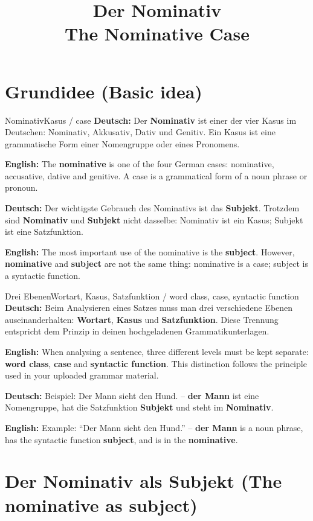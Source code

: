 \documentclass[a4paper,11pt]{article}
\title{Der Nominativ\\\large \textnormal{The Nominative Case}}
\date{}
\newcommand{\GermanText}[1]{\textbf{Deutsch: }#1\par}
\newcommand{\EnglishText}[1]{{\small\color{SoftGray}\textbf{English: }#1\par}}
\begin{document}
\maketitle
\tableofcontents
\newpage

\section{Grundidee \textnormal{(Basic idea)}}

\begin{grammarentry}{Nominativ}{Kasus / case}
\GermanText{Der \textbf{Nominativ} ist einer der vier Kasus im Deutschen: Nominativ, Akkusativ, Dativ und Genitiv. Ein Kasus ist eine grammatische Form einer Nomengruppe oder eines Pronomens.}
\EnglishText{The \textbf{nominative} is one of the four German cases: nominative, accusative, dative and genitive. A case is a grammatical form of a noun phrase or pronoun.}

\GermanText{Der wichtigste Gebrauch des Nominativs ist das \textbf{Subjekt}. Trotzdem sind \textbf{Nominativ} und \textbf{Subjekt} nicht dasselbe: Nominativ ist ein Kasus; Subjekt ist eine Satzfunktion.}
\EnglishText{The most important use of the nominative is the \textbf{subject}. However, \textbf{nominative} and \textbf{subject} are not the same thing: nominative is a case; subject is a syntactic function.}
\end{grammarentry}

\begin{grammarentry}{Drei Ebenen}{Wortart, Kasus, Satzfunktion / word class, case, syntactic function}
\GermanText{Beim Analysieren eines Satzes muss man drei verschiedene Ebenen auseinanderhalten: \textbf{Wortart}, \textbf{Kasus} und \textbf{Satzfunktion}. Diese Trennung entspricht dem Prinzip in deinen hochgeladenen Grammatikunterlagen.}
\EnglishText{When analysing a sentence, three different levels must be kept separate: \textbf{word class}, \textbf{case} and \textbf{syntactic function}. This distinction follows the principle used in your uploaded grammar material.}

\GermanText{Beispiel: \glqq Der Mann sieht den Hund.\grqq{} -- \textbf{der Mann} ist eine Nomengruppe, hat die Satzfunktion \textbf{Subjekt} und steht im \textbf{Nominativ}.}
\EnglishText{Example: ``Der Mann sieht den Hund.'' -- \textbf{der Mann} is a noun phrase, has the syntactic function \textbf{subject}, and is in the \textbf{nominative}.}
\end{grammarentry}

\section{Der Nominativ als Subjekt \textnormal{(The nominative as subject)}}
\end{document}
